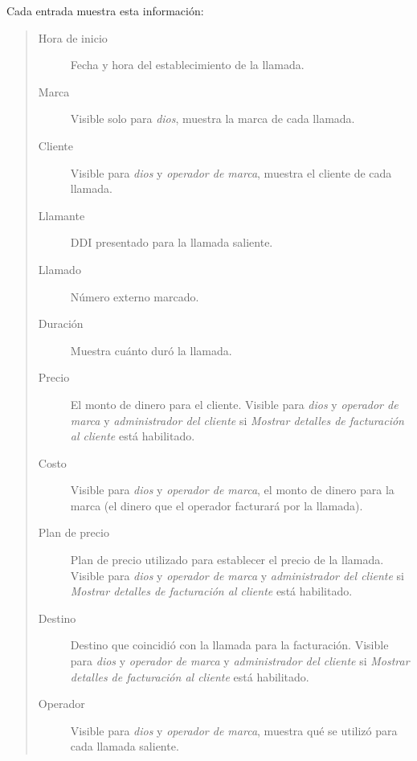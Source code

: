 \documentclass[letterpaper,10pt,spanish]{sphinxmanual}
\begin{document}
Cada entrada muestra esta información:
\begin{quote}
\begin{description}
\item[{Hora de inicio}] \leavevmode
Fecha y hora del establecimiento de la llamada.

\item[{Marca}] \leavevmode
Visible solo para \emph{dios}, muestra la marca de cada llamada.

\item[{Cliente}] \leavevmode
Visible para \emph{dios} y \emph{operador de marca}, muestra el cliente de cada llamada.

\item[{Llamante}] \leavevmode
DDI presentado para la llamada saliente.

\item[{Llamado}] \leavevmode
Número externo marcado.

\item[{Duración}] \leavevmode
Muestra cuánto duró la llamada.

\item[{Precio}] \leavevmode
El monto de dinero para el cliente. Visible para \emph{dios} y \emph{operador de marca} y \emph{administrador del cliente} si \emph{Mostrar detalles de facturación al cliente} está habilitado.

\item[{Costo}] \leavevmode
Visible para \emph{dios} y \emph{operador de marca}, el monto de dinero para la marca (el dinero que el operador facturará por la llamada).

\item[{Plan de precio}] \leavevmode
Plan de precio utilizado para establecer el precio de la llamada. Visible para \emph{dios} y \emph{operador de marca} y \emph{administrador del cliente} si \emph{Mostrar detalles de facturación al cliente} está habilitado.

\item[{Destino}] \leavevmode
Destino que coincidió con la llamada para la facturación. Visible para \emph{dios} y \emph{operador de marca} y \emph{administrador del cliente} si \emph{Mostrar detalles de facturación al cliente} está habilitado.

\item[{Operador}] \leavevmode
Visible para \emph{dios} y \emph{operador de marca}, muestra qué {\hyperref[administration_portal/brand/providers/carriers:carriers]{}} se utilizó para cada llamada saliente.


\end{description}
\end{quote}
\end{document}
